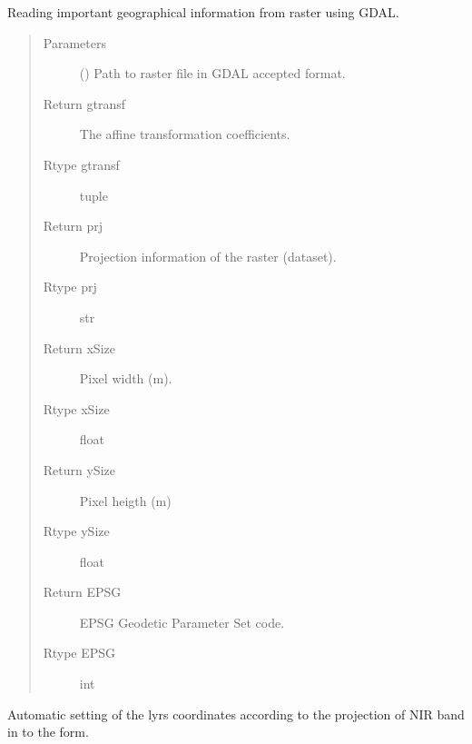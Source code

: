 \documentclass[letterpaper,10pt,english]{sphinxmanual}
\begin{document}
\begin{fulllineitems}
\label{\detokenize{libs:hydrIO.readGeo}}
Reading important geographical information from raster using GDAL.
\begin{quote}\begin{description}
\item[{Parameters}] \leavevmode
{} () \textendash{} Path to raster file in GDAL accepted format.

\item[{Return gtransf}] \leavevmode
The affine transformation coefficients.

\item[{Rtype gtransf}] \leavevmode
tuple

\item[{Return prj}] \leavevmode
Projection information of the raster (dataset).

\item[{Rtype prj}] \leavevmode
str

\item[{Return xSize}] \leavevmode
Pixel width (m).

\item[{Rtype xSize}] \leavevmode
float

\item[{Return ySize}] \leavevmode
Pixel heigth (m)

\item[{Rtype ySize}] \leavevmode
float

\item[{Return EPSG}] \leavevmode
EPSG Geodetic Parameter Set code.

\item[{Rtype EPSG}] \leavevmode
int

\end{description}\end{quote}

\end{fulllineitems}


\begin{fulllineitems}
\label{\detokenize{libs:hydrIO.readLatLong}}
Automatic setting of the lyrs coordinates according to the
projection of NIR band in to the form.

\end{fulllineitems}
\end{document}
